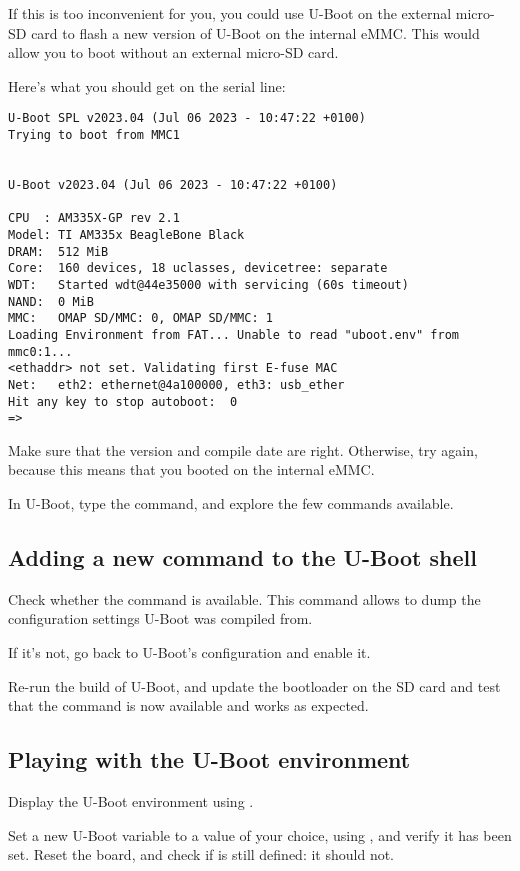 If this is too inconvenient for you, you could use U-Boot on the
external micro-SD card to flash a new version of U-Boot on the internal
eMMC. This would allow you to boot without an external micro-SD card.

Here's what you should get on the serial line:

\begin{verbatim}
U-Boot SPL v2023.04 (Jul 06 2023 - 10:47:22 +0100)
Trying to boot from MMC1


U-Boot v2023.04 (Jul 06 2023 - 10:47:22 +0100)

CPU  : AM335X-GP rev 2.1
Model: TI AM335x BeagleBone Black
DRAM:  512 MiB
Core:  160 devices, 18 uclasses, devicetree: separate
WDT:   Started wdt@44e35000 with servicing (60s timeout)
NAND:  0 MiB
MMC:   OMAP SD/MMC: 0, OMAP SD/MMC: 1
Loading Environment from FAT... Unable to read "uboot.env" from mmc0:1...
<ethaddr> not set. Validating first E-fuse MAC
Net:   eth2: ethernet@4a100000, eth3: usb_ether
Hit any key to stop autoboot:  0
=>
\end{verbatim}

Make sure that the version and compile date are right. Otherwise, try
again, because this means that you booted on the internal eMMC.

In U-Boot, type the  command, and explore the few commands
available.

\subsection{Adding a new command to the U-Boot shell}

Check whether the  command is available. This command
allows to dump the configuration settings U-Boot was compiled from.

If it's not, go back to U-Boot's configuration and enable it.

Re-run the build of U-Boot, and update the bootloader on the SD card
and test that the command is now available and works as expected.

\subsection{Playing with the U-Boot environment}

Display the U-Boot environment using .

Set a new U-Boot variable  to a value of your choice, using
, and verify it has been set. Reset the board, and check
if  is still defined: it should not.

